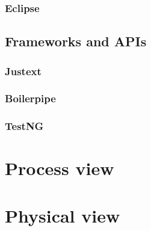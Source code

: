 \subsubsection{Eclipse}
\subsection{Frameworks and APIs}

\subsubsection{Justext}

\subsubsection{Boilerpipe}

\subsubsection{TestNG}





\section{Process view}

\section{Physical view}